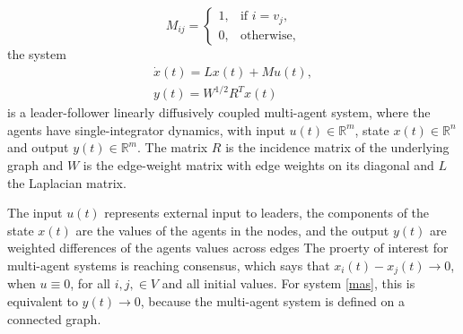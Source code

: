 \begin{equation}
M_{ij}=\left\{\begin{matrix}
1, & \mbox{if } i=v_j,\\
0,& \mbox{otherwise},
\end{matrix}\right.
\end{equation}
 the system 
 \begin{subequations}
 \label{mas}
 \begin{eqnarray}
 \dot{x}(t)=Lx(t)+Mu(t),\\
 y(t)=W^{1/2}R^Tx(t)
 \end{eqnarray}
 \end{subequations}
 is a leader-follower linearly diffusively coupled multi-agent system, where the agents have single-integrator dynamics, with input $u(t)\in \mathbb{R}^m$, state $x(t)\in \mathbb{R}^n$ and output $y(t)\in \mathbb{R}^m$. The matrix $R$ is the incidence matrix of the underlying graph and $W$ is the edge-weight matrix with edge weights on its diagonal and $L$ the Laplacian matrix. 
 
 The input $u(t)$  represents external input to leaders, the components of the state $x(t)$ are the values of the agents in the nodes, and the output $y(t)$ are weighted differences of the agents values across edges The proerty of interest for multi-agent systems is reaching consensus, which says that $x_i(t)-x_j(t)\rightarrow 0$, when $u\equiv 0$, for all $i,j,\in V$ and all initial values. For system \eqref{mas}, this is equivalent to $y(t)\rightarrow 0$, because the multi-agent system is defined on a connected graph. 


